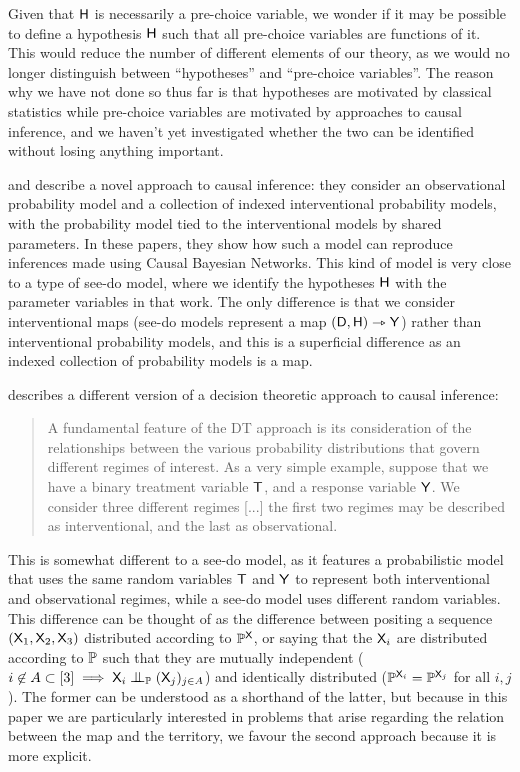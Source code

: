 Given that $\mathsf{H}$ is necessarily a pre-choice variable, we wonder if it may be possible to define a hypothesis $\mathsf{H}$ such that all pre-choice variables are functions of it. This would reduce the number of different elements of our theory, as we would no longer distinguish between ``hypotheses'' and ``pre-choice variables''. The reason why we have not done so thus far is that hypotheses are motivated by classical statistics while pre-choice variables are motivated by approaches to causal inference, and we haven't yet investigated whether the two can be identified without losing anything important.

\citet{lattimore_causal_2019} and \citet{lattimore_replacing_2019} describe a novel approach to causal inference: they consider an observational probability model and a collection of indexed interventional probability models, with the probability model tied to the interventional models by shared parameters. In these papers, they show how such a model can reproduce inferences made using Causal Bayesian Networks. This kind of model is very close to a type of see-do model, where we identify the hypotheses $\mathsf{H}$ with the parameter variables in that work. The only difference is that we consider interventional maps (see-do models represent a map $(\mathsf{D},\mathsf{H})\rightarrowtriangle \mathsf{Y}$) rather than interventional probability models, and this is a superficial difference as an indexed collection of probability models is a map.

\citet{dawid_decision-theoretic_2020} describes a different version of a decision theoretic approach to causal inference:

\begin{quote}
A fundamental feature of the DT approach is its consideration of the relationships between the various probability distributions that govern different regimes of interest. As a very simple example, suppose that we have a binary treatment variable $\mathsf{T}$, and a response variable $\mathsf{Y}$. We consider three different regimes [...] the first two regimes may be described as interventional, and the last as observational.
\end{quote}

This is somewhat different to a see-do model, as it features a probabilistic model that uses the same random variables $\mathsf{T}$ and $\mathsf{Y}$ to represent both interventional and observational regimes, while a see-do model uses different random variables. This difference can be thought of as the difference between positing a sequence $(\mathsf{X}_1,\mathsf{X}_2,\mathsf{X}_3)$ distributed according to $\mathbb{P}^{\mathsf{X}}$, or saying that the $\mathsf{X}_i$ are distributed according to $\mathbb{P}$ such that they are mutually independent ($i\not\in A\subset[3]\implies \RV{X}_i\CI_{\prob{P}} (\RV{X}_j)_{j\in A}$) and identically distributed ($\mathbb{P}^{\mathsf{X}_i}=\mathbb{P}^{\mathsf{X}_j}$ for all $i,j$). The former can be understood as a shorthand of the latter, but because in this paper we are particularly interested in problems that arise regarding the relation between the map and the territory, we favour the second approach because it is more explicit.

